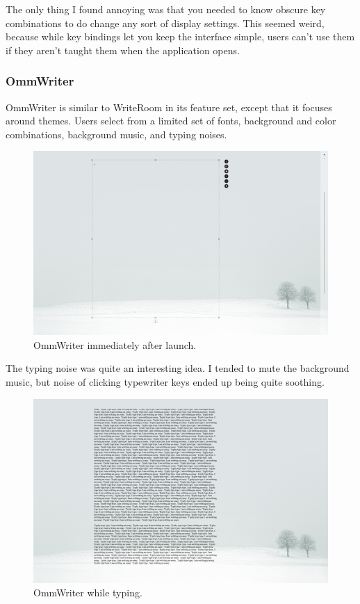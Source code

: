\documentclass[10pt]{article}
\begin{document}
The only thing I found annoying was that you needed to know obscure key combinations to do change any sort of display settings. This seemed weird, because while key bindings let you keep the interface simple, users can't use them if they aren't taught them when the application opens.

\subsubsection{OmmWriter}

OmmWriter \cite{ommwriter} is similar to WriteRoom in its feature set, except that it focuses around themes. Users select from a limited set of fonts, background and color combinations, background music, and typing noises.

\begin{figure}
   \centering
      \includegraphics[width=130mm]{images/ommwriter1.png}
   \caption{OmmWriter immediately after launch.}
\end{figure}

The typing noise was quite an interesting idea. I tended to mute the background music, but noise of clicking typewriter keys ended up being quite soothing.

\begin{figure}
   \centering
      \includegraphics[width=130mm]{images/ommwriter2.png}
   \caption{OmmWriter while typing.}
\end{figure}
\end{document}
